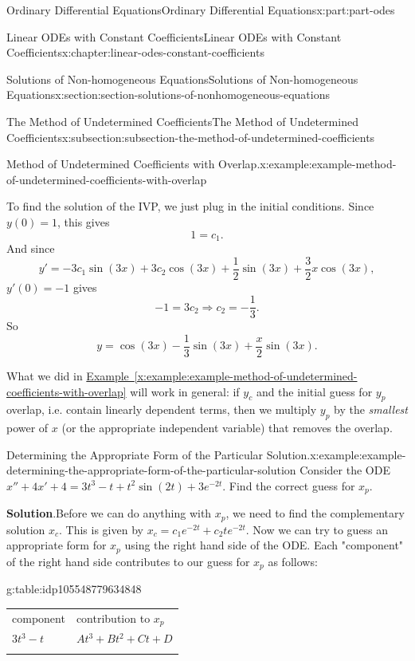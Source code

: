 \documentclass[oneside,10pt,]{book}
\newcommand{\blocktitlefont}{\relax}
\newcommand{\tabularfont}{\relax}
\newcommand{\xreffont}{\relax}
\numberwithin{equation}{part}
\newcommand{\hrulethick} {\noalign{\hrule height 0.11em}}
\begin{document}
\begin{partptx}{Ordinary Differential Equations}{}{Ordinary Differential Equations}{}{}{x:part:part-odes}
\begin{chapterptx}{Linear ODEs with Constant Coefficients}{}{Linear ODEs with Constant Coefficients}{}{}{x:chapter:linear-odes-constant-coefficients}
\begin{sectionptx}{Solutions of Non-homogeneous Equations}{}{Solutions of Non-homogeneous Equations}{}{}{x:section:section-solutions-of-nonhomogeneous-equations}
\begin{subsectionptx}{The Method of Undetermined Coefficients}{}{The Method of Undetermined Coefficients}{}{}{x:subsection:subsection-the-method-of-undetermined-coefficients}
\begin{example}{Method of Undetermined Coefficients with Overlap.}{x:example:example-method-of-undetermined-coefficients-with-overlap}
%
\par
To find the solution of the IVP, we just plug in the initial conditions. Since \(y(0) = 1\), this gives%
\begin{equation*}
1 = c_{1}.
\end{equation*}
And since%
\begin{equation*}
y' = -3c_{1}\sin(3x)+3c_{2}\cos(3x) + \frac{1}{2}\sin(3x)+\frac{3}{2}x\cos(3x),
\end{equation*}
\(y'(0)=-1\) gives%
\begin{equation*}
-1 = 3c_{2}\Rightarrow c_{2} = -\frac{1}{3}.
\end{equation*}
So%
\begin{equation*}
y = \cos(3x)-\frac{1}{3}\sin(3x)+\frac{x}{2}\sin(3x).
\end{equation*}
%
\end{example}
What we did in \hyperref[x:example:example-method-of-undetermined-coefficients-with-overlap]{Example~{\xreffont\ref{x:example:example-method-of-undetermined-coefficients-with-overlap}}} will work in general: if \(y_{c}\) and the initial guess for \(y_{p}\) overlap, i.e. contain linearly dependent terms, then we multiply \(y_{p}\) by the \emph{smallest} power of \(x\) (or the appropriate independent variable) that removes the overlap.%
\begin{example}{Determining the Appropriate Form of the Particular Solution.}{x:example:example-determining-the-appropriate-form-of-the-particular-solution}%
Consider the ODE \(x'' + 4x' + 4 = 3t^{3} - t + t^{2}\sin(2t) + 3e^{-2t}.\) Find the correct guess for \(x_{p}\).%
\par\smallskip%
\noindent\textbf{\blocktitlefont Solution}.\hypertarget{g:solution:idp105548779632416}{}\quad{}Before we can do anything with \(x_{p}\), we need to find the complementary solution \(x_{c}\). This is given by \(x_{c} = c_{1}e^{-2t} + c_{2}te^{-2t}.\) Now we can try to guess an appropriate form for \(x_{p}\) using the right hand side of the ODE. Each "component" of the right hand side contributes to our guess for \(x_{p}\) as follows: \begin{tableptx}{\textbf{}}{g:table:idp105548779634848}{}%
\centering%
{\tabularfont%
\begin{tabular}{ll}\hrulethick
component&contribution to \(x_{p}\)\tabularnewline\hrulethick
\(3t^{3} - t\)&\(At^{3} + Bt^{2} + Ct + D\)\tabularnewline\hrulethick

\end{tabular}}
\end{tableptx}
\end{example}
\end{subsectionptx}
\end{sectionptx}
\end{chapterptx}
\end{partptx}
\end{document}
